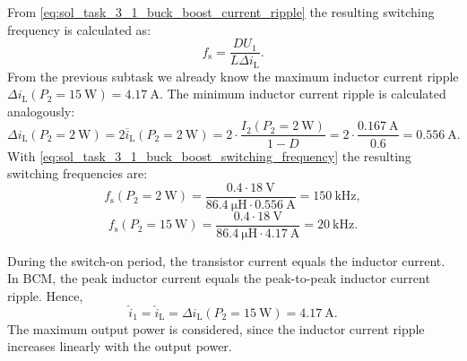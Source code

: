 \begin{solutionblock}
	From \eqref{eq:sol_task_3_1_buck_boost_current_ripple} the resulting switching frequency is calculated as:
	\begin{equation}
		f_\mathrm{s} = \frac{D U_1}{L \Delta i_{\mathrm{L}}}.
		\label{eq:sol_task_3_1_buck_boost_switching_frequency}
	\end{equation}
	From the previous subtask we already know the maximum inductor current ripple $\Delta i_{\mathrm{L}}(P_2=\SI{15}{\watt}) = \SI{4.17}{\ampere}$. The minimum inductor current ripple is calculated analogously:
	\begin{equation}
		\Delta i_{\mathrm{L}}(P_2=\SI{2}{\watt}) = 2 \overline{i}_\mathrm{L}(P_2=\SI{2}{\watt}) = 2 \cdot \frac{I_\mathrm{2}(P_2=\SI{2}{\watt})}{1-D} = 2 \cdot \frac{\SI{0.167}{\ampere}}{0.6} = \SI{0.556}{\ampere}.
	\end{equation}
	With \eqref{eq:sol_task_3_1_buck_boost_switching_frequency} the resulting switching frequencies are:
	\begin{equation}
		f_\mathrm{s}(P_\mathrm{2}=\SI{2}{\watt})=\frac{0.4\cdot\SI{18}{\volt}}{\SI{86.4}{\micro\henry}\cdot \SI{0.556}{\ampere}}=\SI{150}{\kilo \hertz},
	\end{equation}
	\begin{equation}
		f_\mathrm{s}(P_\mathrm{2}=\SI{15}{\watt})=\frac{0.4\cdot\SI{18}{\volt}}{\SI{86.4}{\micro\henry}\cdot \SI{4.17}{\ampere}}=\SI{20}{\kilo \hertz}.
	\end{equation}
\end{solutionblock}

\begin{solutionblock}
	During the switch-on period, the transistor current equals
	the inductor current. In BCM, the peak inductor current
	equals the peak-to-peak inductor current ripple. Hence,
	\begin{equation}
		\hat{i}_1
		= \hat{i}_\mathrm{L}
		= \Delta i_\mathrm{L}(P_2=\SI{15}{\watt})
		= \SI{4.17}{\ampere}.
	\end{equation}
	The maximum output power is considered, since the inductor
	current ripple increases linearly with the output power.
\end{solutionblock}


